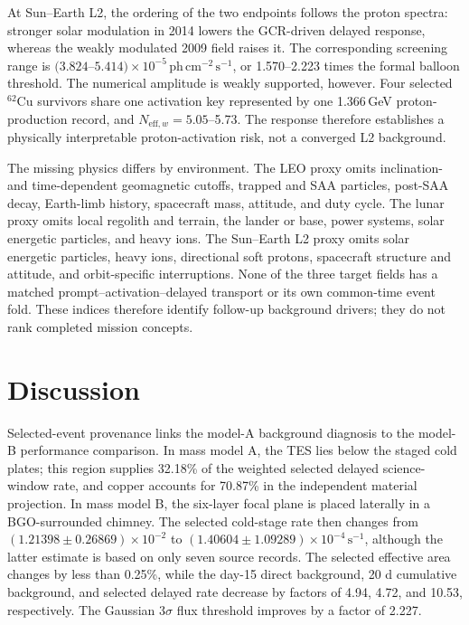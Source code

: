\documentclass[11pt]{article}
\newcommand{\phcms}{\ensuremath{\,\mathrm{ph\,cm^{-2}\,s^{-1}}}}
\newcommand{\cps}{\ensuremath{\,\mathrm{s^{-1}}}}
\begin{document}
At Sun--Earth L2, the ordering of the two endpoints follows the proton spectra:
stronger solar modulation in 2014 lowers the GCR-driven delayed response,
whereas the weakly modulated 2009 field raises it. The corresponding screening
range is $(3.824$--$5.414)\times10^{-5}\phcms$, or 1.570--2.223 times the
formal balloon threshold. The numerical amplitude is weakly supported,
however. Four selected $^{62}$Cu survivors share one activation key represented
by one 1.366\,GeV proton-production record, and
$N_{\mathrm{eff},w}=5.05$--5.73. The response therefore establishes a
physically interpretable proton-activation risk, not a converged L2
background.

The missing physics differs by environment. The LEO proxy omits
inclination- and time-dependent geomagnetic cutoffs, trapped and SAA particles,
post-SAA decay, Earth-limb history, spacecraft mass, attitude, and duty cycle.
The lunar proxy omits local regolith and terrain, the lander or base, power
systems, solar energetic particles, and heavy ions. The Sun--Earth L2 proxy
omits solar energetic particles, heavy ions, directional soft protons,
spacecraft structure and attitude, and orbit-specific interruptions. None of
the three target fields has a matched prompt--activation--delayed transport or
its own common-time event fold. These indices therefore identify follow-up
background drivers; they do not rank completed mission concepts.

\FloatBarrier

\section{Discussion}
\label{sec:discussion}

Selected-event provenance links the model-A background diagnosis to the
model-B performance comparison. In mass model A, the TES lies below the staged cold
plates; this region supplies 32.18\% of the weighted selected delayed science-window
rate, and copper accounts for 70.87\% in the independent material projection. In
mass model B, the six-layer focal plane is placed laterally in a BGO-surrounded
chimney. The selected cold-stage rate then changes from
$(1.21398\pm0.26869)\times10^{-2}$ to
$(1.40604\pm1.09289)\times10^{-4}\cps$, although the latter estimate is based on
only seven source records. The selected effective area changes by less than
0.25\%, while the day-15 direct background, 20 d cumulative background, and
selected delayed rate decrease by factors of 4.94, 4.72, and 10.53,
respectively. The Gaussian $3\sigma$ flux threshold improves by a factor of
2.227.
\end{document}
